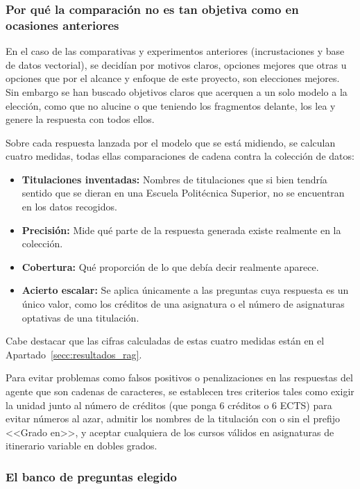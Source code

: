 \subsubsection{Por qué la comparación no es tan objetiva como en ocasiones anteriores}

En el caso de las comparativas y experimentos anteriores (incrustaciones y base de datos vectorial), se decidían por motivos claros, opciones mejores que otras u opciones que por el alcance y enfoque de este proyecto, son elecciones mejores. Sin embargo se han buscado objetivos claros que acerquen a un solo modelo a la elección, como que no alucine o que teniendo los fragmentos delante, los lea y genere la respuesta con todos ellos.


Sobre cada respuesta lanzada por el modelo que se está midiendo, se calculan cuatro medidas, todas ellas comparaciones de cadena contra la colección de datos:

\begin{itemize}
  \item \textbf{Titulaciones inventadas: } Nombres de titulaciones que si bien tendría sentido que se dieran en una Escuela Politécnica Superior, no se encuentran en los datos recogidos.
  \item \textbf{Precisión: }Mide qué parte de la respuesta generada existe realmente en la colección.
  \item \textbf{Cobertura: }Qué proporción de lo que debía decir realmente aparece.
  \item \textbf{Acierto escalar: }Se aplica únicamente a las preguntas cuya respuesta es un único valor, como los créditos de una asignatura o el número de asignaturas optativas de una titulación.
\end{itemize}

Cabe destacar que las cifras calculadas de estas cuatro medidas están en el Apartado~\ref{secc:resultados_rag}.


Para evitar problemas como falsos positivos o penalizaciones en las respuestas del agente que son cadenas de caracteres, se establecen tres criterios tales como exigir la unidad junto al número de créditos (que ponga 6 créditos o 6 ECTS) para evitar números al azar, admitir los nombres de la titulación con o sin el prefijo <<Grado en>>, y aceptar cualquiera de los cursos válidos en asignaturas de itinerario variable en dobles grados.

\subsubsection{El banco de preguntas elegido}

